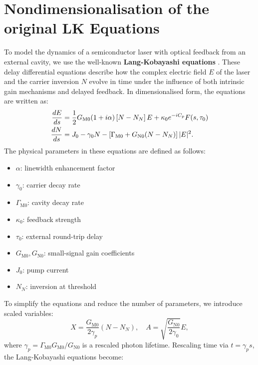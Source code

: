 \section{Nondimensionalisation of the original LK Equations}
\label{app:LK_nondim}
%
\let\cleardoublepage\origcleardoublepage
%
To model the dynamics of a semiconductor laser with optical feedback from an external cavity, we use the well-known \textbf{Lang-Kobayashi equations} \cite{lang1980external}. These delay differential equations describe how the complex electric field \( E \) of the laser and the carrier inversion \( N \) evolve in time under the influence of both intrinsic gain mechanisms and delayed feedback. In dimensionalised form, the equations are written as:
%
\begin{gather}
\label{eq:dimensionalised_LK}
\begin{aligned}
\frac{d E}{d s} &= \frac{1}{2} G_{\mathrm{M}0}(1 + i \alpha) \left[N - N_N\right] E + \kappa_0 e^{-i C_p} F(s, \tau_0)\\
\frac{d N}{d s} &= J_0 - \gamma_0 N - \left[\Gamma_{\mathrm{M}0} + G_{\mathrm{N}0}(N - N_N)\right] |E|^2.\\
\end{aligned}
\raisetag{-1.5em} %
\end{gather}
%
The physical parameters in these equations are defined as follows:
\begin{itemize}
  \item \( \alpha \): linewidth enhancement factor
  \item \( \gamma_0 \): carrier decay rate
  \item \( \Gamma_{\mathrm{M}0} \): cavity decay rate
  \item \( \kappa_0 \): feedback strength
  \item \( \tau_0 \): external round-trip delay
  \item \( G_{\mathrm{M}0}, G_{\mathrm{N}0} \): small-signal gain coefficients
  \item \( J_0 \): pump current
  \item \( N_N \): inversion at threshold
\end{itemize}
%
\par
%
To simplify the equations and reduce the number of parameters, we introduce scaled variables:
%
\[
X = \frac{G_{\mathrm{M}0}}{2 \gamma_p}(N - N_N), \quad A = \sqrt{\frac{G_{\mathrm{N}0}}{2 \gamma_0}} E,
\]
where \( \gamma_p = \Gamma_{\mathrm{M}0} G_{\mathrm{M}0} / G_{\mathrm{N}0} \) is a rescaled photon lifetime. Rescaling time via \( t = \gamma_p s \), the Lang-Kobayashi equations become:
